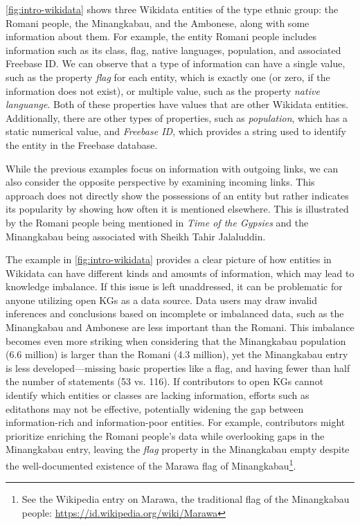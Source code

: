 \autoref{fig:intro-wikidata} shows three Wikidata entities of the type ethnic group: the Romani people, the Minangkabau, and the Ambonese, along with some information about them. For example, the entity Romani people includes information such as its class, flag, native languages, population, and associated Freebase ID. We can observe that a type of information can have a single value, such as the property \textit{flag} for each entity, which is exactly one (or zero, if the information does not exist), or multiple value, such as the property \textit{native languange}. Both of these properties have values that are other Wikidata entities. Additionally, there are other types of properties, such as \textit{population}, which has a static numerical value, and \textit{Freebase ID}, which provides a string used to identify the entity in the Freebase database.

While the previous examples focus on information with outgoing links, we can also consider the opposite perspective by examining incoming links. This approach does not directly show the possessions of an entity but rather indicates its popularity by showing how often it is mentioned elsewhere. This is illustrated by the Romani people being mentioned in \textit{Time of the Gypsies} and the Minangkabau being associated with Sheikh Tahir Jalaluddin.

The example in \autoref{fig:intro-wikidata} provides a clear picture of how entities in Wikidata can have different kinds and amounts of information, which may lead to knowledge imbalance. If this issue is left unaddressed, it can be problematic for anyone utilizing open KGs as a data source. Data users may draw invalid inferences and conclusions based on incomplete or imbalanced data, such as the Minangkabau and Ambonese are less important than the Romani. This imbalance becomes even more striking when considering that the Minangkabau population (6.6 million) is larger than the Romani (4.3 million), yet the Minangkabau entry is less developed—missing basic properties like a flag, and having fewer than half the number of statements (53 vs. 116). If contributors to open KGs cannot identify which entities or classes are lacking information, efforts such as editathons may not be effective, potentially widening the gap between information-rich and information-poor entities. For example, contributors might prioritize enriching the Romani people's data while overlooking gaps in the Minangkabau entry, leaving the \textit{flag} property in the Minangkabau empty despite the well-documented existence of the Marawa flag of Minangkabau\footnote{See the Wikipedia entry on Marawa, the traditional flag of the Minangkabau people: \url{https://id.wikipedia.org/wiki/Marawa}}.

